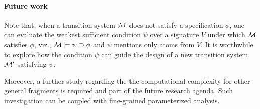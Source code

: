 \documentclass[letterpaper]{article} %
\begin{document}
\paragraph{Future work}
Note that, when a transition system $\cal M$ does not satisfy a specification $\phi$, one can evaluate the weakest sufficient condition  $\psi$ over a signature $V$ under which ${\cal M}$ satisfies $\phi$, viz., ${\cal M}\models\psi\supset \phi$ and $\psi$ mentions only atoms from $V$. It is worthwhile to explore how the condition $\psi$ can guide the design of a new transition system ${\cal M}'$ satisfying $\psi$.



Moreover, a further study regarding the the computational complexity for other general fragments is required and part of the future research agenda. Such investigation can be coupled with fine-grained parameterized analysis.





\clearpage
\appendix
\end{document}
